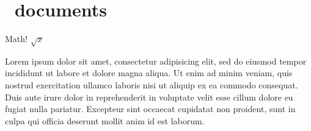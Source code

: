 \chapter{\PolyTeX\ documents} %
\label{cha:polytex_tutorial}

Math! $\sqrt{x}$

Lorem ipsum dolor sit amet, consectetur adipisicing elit, sed do eiusmod
tempor incididunt ut labore et dolore magna aliqua. Ut enim ad minim veniam,
quis nostrud exercitation ullamco laboris nisi ut aliquip ex ea commodo
consequat. Duis aute irure dolor in reprehenderit in voluptate velit esse
cillum dolore eu fugiat nulla pariatur. Excepteur sint occaecat cupidatat non
proident, sunt in culpa qui officia deserunt mollit anim id est laborum.


